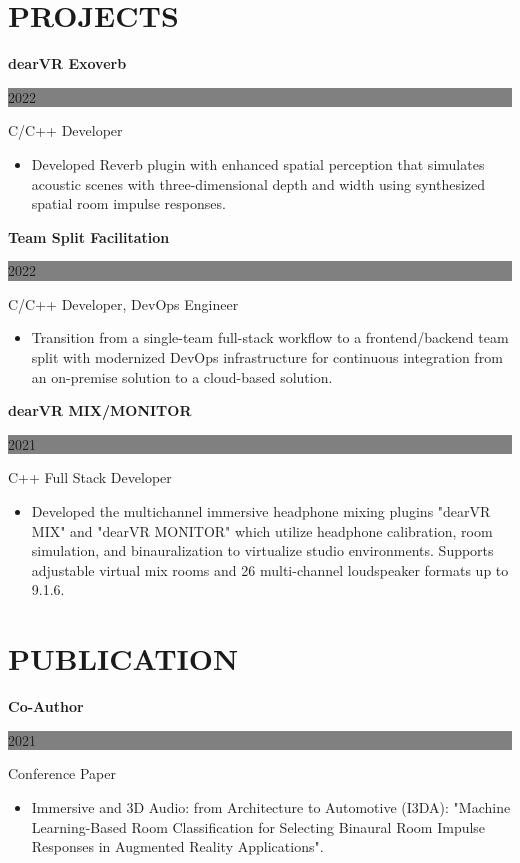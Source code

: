 \documentclass[paper=a4,fontsize=9pt]{scrartcl}
\newcommand{\sepspace}{\vspace*{1em}}
\newcommand{\NewPart}[1]{\section*{\uppercase{#1}}}
\newcommand{\ExperienceEntry}[4]{
	\noindent \textbf{#1} \hfill
	\colorbox{Grey}{
		\parbox{6em}{
		\hfill\color{White}#2}} \par
	\noindent #3 \par
    \noindent \small #4
	\normalsize \par
}
\begin{document}
\NewPart{Projects}{}
\ExperienceEntry{dearVR Exoverb}{2022}{C/C++ Developer}{
    \begin{itemize}[leftmargin=1.2em, label={}]
        \item Developed Reverb plugin with enhanced spatial perception that simulates acoustic scenes with three-dimensional depth and width using synthesized spatial room impulse responses.
    \end{itemize}
}
\sepspace
\ExperienceEntry{Team Split Facilitation}{2022}{C/C++ Developer, DevOps Engineer}{
    \begin{itemize}[leftmargin=1.2em, label={}]
        \item Transition from a single-team full-stack workflow to a frontend/backend team split with modernized DevOps infrastructure for continuous integration from an on-premise solution to a cloud-based solution.
    \end{itemize}
}
\sepspace
\ExperienceEntry{dearVR MIX/MONITOR}{2021}{C++ Full Stack Developer}{
    \begin{itemize}[leftmargin=1.2em, label={}]
        \item Developed the multichannel immersive headphone mixing plugins "dearVR MIX" and "dearVR MONITOR" which utilize headphone calibration, room simulation, and binauralization to virtualize studio environments. Supports adjustable virtual mix rooms and 26 multi-channel loudspeaker formats up to 9.1.6.
    \end{itemize}
}

\NewPart{Publication}{}
\ExperienceEntry{Co-Author}{2021}{Conference Paper}{
    \begin{itemize}[leftmargin=1.2em, label={}]
        \item Immersive and 3D Audio: from Architecture to Automotive (I3DA): "Machine Learning-Based Room Classification for Selecting Binaural Room Impulse Responses in Augmented Reality Applications".
    \end{itemize}
}
\end{document}

